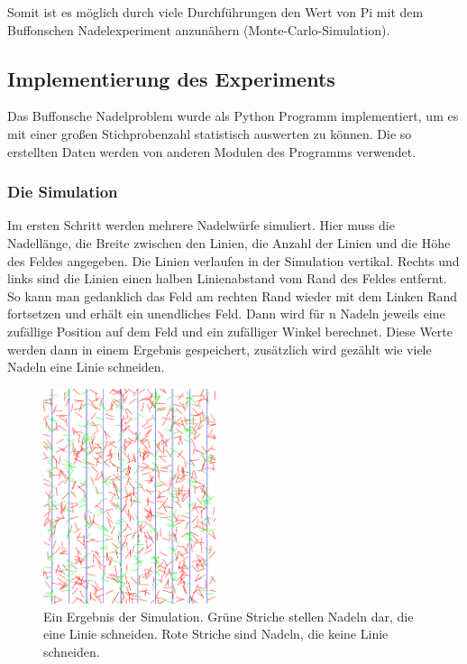 \documentclass[10pt,twocolumn]{scrartcl}
\begin{document}
		Somit ist es möglich durch viele Durchführungen den Wert von Pi mit dem Buffonschen Nadelexperiment anzunähern (Monte-Carlo-Simulation).

	\subsection{Implementierung des Experiments}
		Das Buffonsche Nadelproblem wurde als Python\cite{Python} Programm implementiert, um es mit einer großen Stichprobenzahl statistisch auswerten zu können. Die so erstellten Daten werden von anderen Modulen des Programms verwendet.

		\subsubsection*{Die Simulation}
			\label{chap_sim_results}
			Im ersten Schritt werden mehrere Nadelwürfe simuliert. Hier muss die Nadellänge, die Breite zwischen den Linien, die Anzahl der Linien und die Höhe des Feldes angegeben. Die Linien verlaufen in der Simulation vertikal. Rechts und links sind die Linien einen halben Linienabstand vom Rand des Feldes entfernt. So kann man gedanklich das Feld am rechten Rand wieder mit dem Linken Rand fortsetzen und erhält ein unendliches Feld. Dann wird für n Nadeln jeweils eine zufällige Position auf dem Feld und ein zufälliger Winkel berechnet. Diese Werte werden dann in einem Ergebnis gespeichert, zusätzlich wird gezählt wie viele Nadeln eine Linie schneiden.

			\begin{figure}[htb]
				\centering
				\includegraphics[width=0.45\textwidth]{images/needels.png}
				\caption{Ein Ergebnis der Simulation. Grüne Striche stellen Nadeln dar, die eine Linie schneiden. Rote Striche sind Nadeln, die keine Linie schneiden.}
				\label{fig:needels}
			\end{figure}
\end{document}
